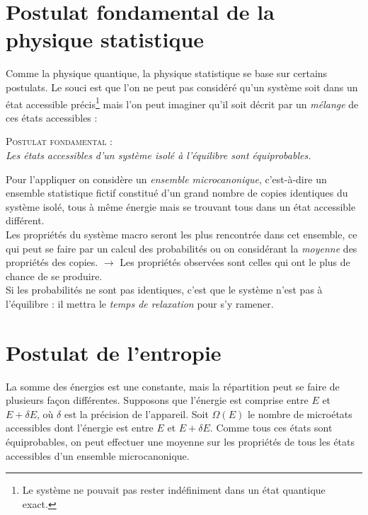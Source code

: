 \documentclass[british,french,11pt, a4paper, openany]{book}
\begin{document}
\section{Postulat fondamental de la physique statistique}
Comme la physique quantique, la physique statistique se base sur certains postulats. Le souci est 
que l'on ne peut pas considéré qu'un système soit dans un état accessible précis\footnote{Le système
	ne pouvait pas rester indéfiniment dans un état quantique exact.} mais l'on peut imaginer qu'il soit 
décrit par un \textit{mélange} de ces états accessibles :
\begin{center}
	\textsc{Postulat fondamental} :\\
	\textit{Les états accessibles d'un système isolé à l'équilibre sont équiprobables.}
\end{center}
Pour l'appliquer on considère un \textit{ensemble microcanonique}, c'est-à-dire un ensemble statistique
fictif constitué d'un grand nombre de copies identiques du système isolé, tous à même énergie mais se 
trouvant tous dans un état accessible différent.\\
Les propriétés du système macro seront les plus rencontrée dans cet ensemble, ce qui peut se
faire par un calcul des probabilités ou on considérant la \textit{moyenne} des propriétés des copies.
$\rightarrow$ Les propriétés observées sont celles qui ont le plus de chance de se produire.\\
Si les probabilités ne sont pas identiques, c'est que le système n'est pas à l'équilibre : il mettra le 
\textit{temps de relaxation} pour s'y ramener.


\section{Postulat de l'entropie}
La somme des énergies est une constante, mais la répartition peut se faire de plusieurs façon 
différentes. Supposons que l'énergie est comprise entre $E$ et $E+\delta E$, où $\delta$ est la
précision de l'appareil. Soit $\Omega(E)$ le nombre de microétats accessibles dont l'énergie est
entre $E$ et $E+\delta E$. Comme tous ces états sont équiprobables, on peut effectuer une moyenne
sur les propriétés de tous les états accessibles d'un ensemble microcanonique.\\
\end{document}
